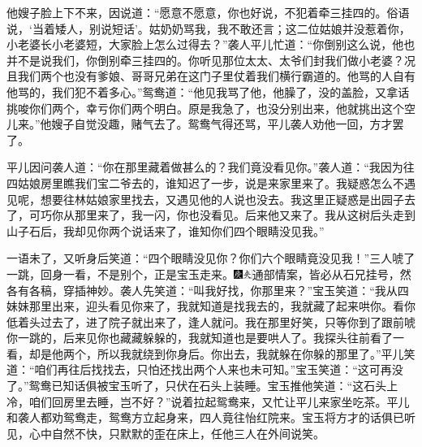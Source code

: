 他嫂子脸上下不来，因说道：``愿意不愿意，你也好说，不犯着牵三挂四的。俗语说，`当着矮人，别说短话'。姑奶奶骂我，我不敢还言；这二位姑娘并没惹着你，小老婆长小老婆短，大家脸上怎么过得去？''袭人平儿忙道：``你倒别这么说，他也并不是说我们，你倒别牵三挂四的。你听见那位太太、太爷们封我们做小老婆？况且我们两个也没有爹娘、哥哥兄弟在这门子里仗着我们横行霸道的。他骂的人自有他骂的，我们犯不着多心。''鸳鸯道：``他见我骂了他，他臊了，没的盖脸，又拿话挑唆你们两个，幸亏你们两个明白。原是我急了，也没分别出来，他就挑出这个空儿来。''他嫂子自觉没趣，赌气去了。鸳鸯气得还骂，平儿袭人劝他一回，方才罢了。

平儿因问袭人道：``你在那里藏着做甚么的？我们竟没看见你。''袭人道：``我因为往四姑娘房里瞧我们宝二爷去的，谁知迟了一步，说是来家里来了。我疑惑怎么不遇见呢，想要往林姑娘家里找去，又遇见他的人说也没去。我这里正疑惑是出园子去了，可巧你从那里来了，我一闪，你也没看见。后来他又来了。我从这树后头走到山子石后，我却见你两个说话来了，谁知你们四个眼睛没见我。''

一语未了，又听身后笑道：``四个眼睛没见你？你们六个眼睛竟没见我！''三人唬了一跳，回身一看，不是别个，正是宝玉走来。{\includegraphics[width=3mm]{../Images/00004}\includegraphics[width=3mm]{../Images/00012}\footnotesize \kaishu 通部情案，皆必从石兄挂号，然各有各稿，穿插神妙。}袭人先笑道：``叫我好找，你那里来？''宝玉笑道：``我从四妹妹那里出来，迎头看见你来了，我就知道是找我去的，我就藏了起来哄你。看你低着头过去了，进了院子就出来了，逢人就问。我在那里好笑，只等你到了跟前唬你一跳的，后来见你也藏藏躲躲的，我就知道也是要哄人了。我探头往前看了一看，却是他两个，所以我就绕到你身后。你出去，我就躲在你躲的那里了。''平儿笑道：``咱们再往后找找去，只怕还找出两个人来也未可知。''宝玉笑道：``这可再没了。''鸳鸯已知话俱被宝玉听了，只伏在石头上装睡。宝玉推他笑道：``这石头上冷，咱们回房里去睡，岂不好？''说着拉起鸳鸯来，又忙让平儿来家坐吃茶。平儿和袭人都劝鸳鸯走，鸳鸯方立起身来，四人竟往怡红院来。宝玉将方才的话俱已听见，心中自然不快，只默默的歪在床上，任他三人在外间说笑。

